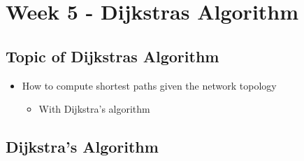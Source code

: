 \documentclass[12pt]{ctexart}   %
\begin{document}
\section{Week 5 - Dijkstras Algorithm}
	\subsection{Topic of Dijkstras Algorithm}
	\begin{itemize}
		\item How to compute shortest paths given the network topology
		\begin{itemize}
			\item With Dijkstra's algorithm
		\end{itemize}
	\end{itemize}
	
	\subsection{Dijkstra's Algorithm}
\end{document}
